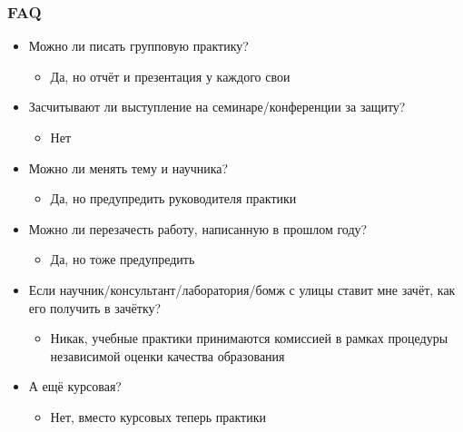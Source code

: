 \documentclass[xetex,mathserif,serif]{beamer}
\begin{document}
    \begin{frame}
        \frametitle{FAQ}
        \begin{small}
            \begin{itemize}
                \item Можно ли писать групповую практику?
                \begin{itemize}
                    \item Да, но отчёт и презентация у каждого свои
                \end{itemize}
                \item Засчитывают ли выступление на семинаре/конференции за защиту?
                \begin{itemize}
                    \item Нет
                \end{itemize}
                \item Можно ли менять тему и научника?
                \begin{itemize}
                    \item Да, но предупредить руководителя практики
                \end{itemize}
                \item Можно ли перезачесть работу, написанную в прошлом году?
                \begin{itemize}
                    \item Да, но тоже предупредить
                \end{itemize}
                \item Если научник/консультант/лаборатория/бомж с улицы ставит мне зачёт, как его получить в зачётку?
                \begin{itemize}
                    \item Никак, учебные практики принимаются комиссией в рамках процедуры независимой оценки качества образования
                \end{itemize}
                \item А ещё курсовая?
                \begin{itemize}
                    \item Нет, вместо курсовых теперь практики
                \end{itemize}
            \end{itemize}
        \end{small}
    \end{frame}
\end{document}
